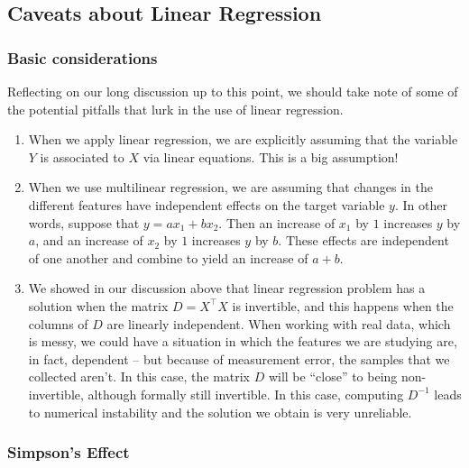 \documentclass[]{article}
\begin{document}
\hypertarget{caveats-about-linear-regression}{%
\subsection{Caveats about Linear
Regression}\label{caveats-about-linear-regression}}

\hypertarget{basic-considerations}{%
\subsubsection{Basic considerations}\label{basic-considerations}}

Reflecting on our long discussion up to this point, we should take note
of some of the potential pitfalls that lurk in the use of linear
regression.

\begin{enumerate}
\def\labelenumi{\arabic{enumi}.}
\item
  When we apply linear regression, we are explicitly assuming that the
  variable \(Y\) is associated to \(X\) via linear equations. This is a
  big assumption!
\item
  When we use multilinear regression, we are assuming that changes in
  the different features have independent effects on the target variable
  \(y\). In other words, suppose that \(y=ax_1+bx_2\). Then an increase
  of \(x_1\) by \(1\) increases \(y\) by \(a\), and an increase of
  \(x_2\) by \(1\) increases \(y\) by \(b\). These effects are
  independent of one another and combine to yield an increase of
  \(a+b\).
\item
  We showed in our discussion above that linear regression problem has a
  solution when the matrix \(D=X^{\intercal}X\) is invertible, and this
  happens when the columns of \(D\) are linearly independent. When
  working with real data, which is messy, we could have a situation in
  which the features we are studying are, in fact, dependent -- but
  because of measurement error, the samples that we collected aren't. In
  this case, the matrix \(D\) will be ``close'' to being non-invertible,
  although formally still invertible. In this case, computing \(D^{-1}\)
  leads to numerical instability and the solution we obtain is very
  unreliable.
\end{enumerate}

\hypertarget{simpsons-effect}{%
\subsubsection{Simpson's Effect}\label{simpsons-effect}}
\end{document}
